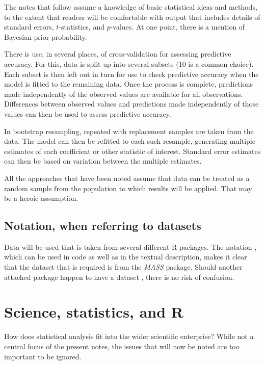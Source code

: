 The notes that follow assume a knowledge of basic statistical
ideas and methods, to the extent that readers will be comfortable
with output that includes details of standard errors, $t$-statistics,
and $p$-values. At one point, there is a mention of Bayesian
prior probability.  

There is use, in several places, of
cross-validation for assessing predictive accuracy.  For this, data
is split up into several subsets (10 is a common choice).  Each
subset is then left out in turn for use to check predictive accuracy
when the model is fitted to the remaining data.  Once the process is
complete, predictions made independently of the observed values are
available for all observations.  Differences between observed values
and predictions made independently of those values can then be used
to assess predictive accuracy.

In bootstrap resampling, repeated with replacement samples are taken
from the data.  The model can then be refitted to each such resample,
generating multiple estimates of each coefficient or other statistic
of interest.  Standard error estimates can then be based on variation
between the multiple estimates.

All the approaches that have been noted assume that data can be treated
as a random sample from the population to which results will be applied.
That may be a heroic assumption.

\subsection*{Notation, when referring to datasets}

Data will be used that is taken from several different R packages.
The notation , which can be used in code as well
as in the textual description, makes it clear that the dataset
 that is required is from the {\em MASS} package.
Should another attached package happen to have a dataset
, there is no risk of confusion.

\section{Science, statistics, and R}

How does statistical analysis fit into the wider scientific
enterprise? While not a central focus of the present notes, 
the issues that will now be noted are too important to be
ignored.

